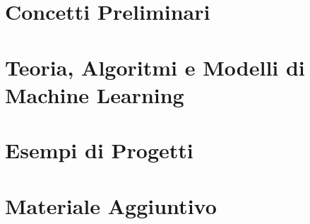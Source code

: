 \documentclass[a4paper,11pt]{book}
\numberwithin{equation}{chapter}
\begin{document}


\tableofcontents
\cleardoublepage

\mainmatter

\part{Concetti Preliminari}

\part{Teoria, Algoritmi e Modelli di Machine Learning}











\appendix
\part{Esempi di Progetti}


\part{Materiale Aggiuntivo}




\backmatter
\printbibliography
\end{document}
